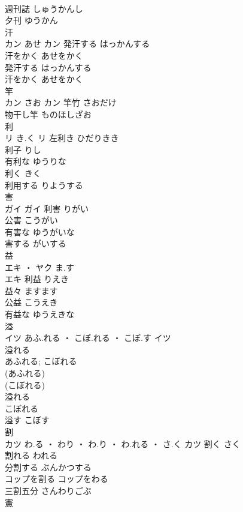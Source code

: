 \documentclass[8pt]{extreport}
\begin{document}
\begin{CJK}{UTF8}{min}
\\	週刊誌	しゅうかんし	
\\	夕刊	ゆうかん	
\\	汗	
\\	カン	あせ	カン	発汗する	はっかんする	
\\	汗をかく	あせをかく	
\\	発汗する	はっかんする	
\\	汗をかく	あせをかく	
\\	竿	
\\	カン	さお	カン	竿竹	さおだけ	
\\	物干し竿	ものほしざお	
\\	利	
\\	リ	き.く	リ	左利き	ひだりきき	
\\	利子	りし	
\\	有利な	ゆうりな	
\\	利く	きく	
\\	利用する	りようする	
\\	害	
\\	ガイ		ガイ	利害	りがい	
\\	公害	こうがい	
\\	有害な	ゆうがいな	
\\	害する	がいする	
\\	益	
\\	エキ ・ ヤク	ま.す
\\	エキ	利益	りえき	
\\	益々	ますます	
\\	公益	こうえき	
\\	有益な	ゆうえきな	
\\	溢	
\\	イツ	あふ.れる ・ こぼ.れる ・ こぼ.す	イツ	
\\	溢れる 
\\	あふれる; こぼれる
\\	(あふれる) 
\\	(こぼれる) 
\\	溢れる 
\\	こぼれる	
\\	溢す	こぼす	
\\	割	
\\	カツ	わ.る ・ わり ・ わ.り ・ わ.れる ・ さ.く	カツ	割く	さく	
\\	割れる	われる	
\\	分割する	ぶんかつする	
\\	コップを割る	コップをわる	
\\	三割五分	さんわりごぶ	
\\	憲	

\end{CJK}
\end{document}
